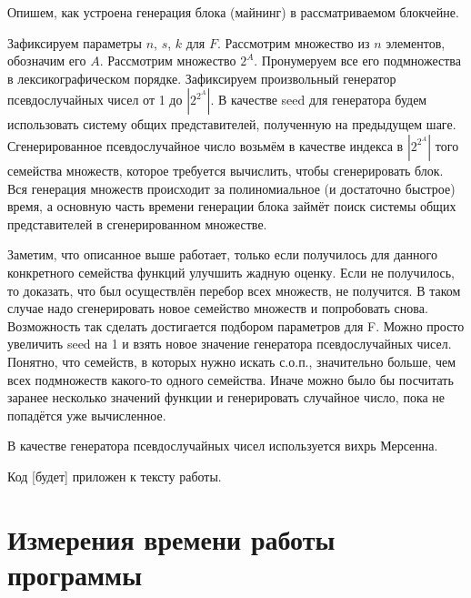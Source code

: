 \documentclass{article}
\begin{document}
    Опишем, как устроена генерация блока (майнинг) в рассматриваемом блокчейне. 

    Зафиксируем параметры $n$, $s$, $k$ для $F$. Рассмотрим множество из $n$ элементов, обозначим его $A$. Рассмотрим множество $2^A$. Пронумеруем все его подмножества в лексикографическом порядке. Зафиксируем произвольный генератор псевдослучайных чисел от 1 до $|2^{2^A}|$. В качестве seed для генератора будем использовать систему общих представителей, полученную на предыдущем шаге. Сгенерированное псевдослучайное число возьмём в качестве индекса в $|2^{2^A}|$ того семейства множеств, которое требуется вычислить, чтобы сгенерировать блок. Вся генерация множеств происходит за полиномиальное (и достаточно быстрое) время, а основную часть времени генерации блока займёт поиск системы общих представителей в сгенерированном множестве.

    Заметим, что описанное выше работает, только если получилось для данного конкретного семейства функций улучшить жадную оценку. Если не получилось, то доказать, что был осуществлён перебор всех множеств, не получится. В таком случае надо сгенерировать новое семейство множеств и попробовать снова. Возможность так сделать достигается подбором параметров для F. Можно просто увеличить seed на 1 и взять новое значение генератора псевдослучайных чисел. Понятно, что семейств, в которых нужно искать с.о.п., значительно больше, чем всех подмножеств какого-то одного семейства. Иначе можно было бы посчитать заранее несколько значений функции и генерировать случайное число, пока не попадётся уже вычисленное.

    В качестве генератора псевдослучайных чисел используется вихрь Мерсенна. 

    Код [будет] приложен к тексту работы.

\section{Измерения времени работы программы}
    
\end{document}
